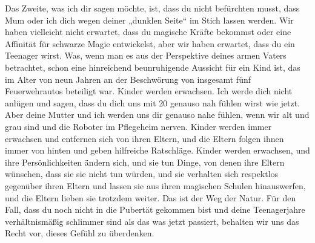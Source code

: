 \begin{writtenNote}
Das Zweite, was ich dir sagen möchte, ist, dass du nicht befürchten musst, dass Mum oder ich dich wegen deiner „dunklen Seite“ im Stich lassen werden. Wir haben vielleicht nicht erwartet, dass du magische Kräfte bekommst oder eine Affinität für schwarze Magie entwickelst, aber wir haben erwartet, dass du ein Teenager wirst. Was, wenn man es aus der Perspektive deines armen Vaters betrachtet, schon eine hinreichend beunruhigende Aussicht für ein Kind ist, das im Alter von neun Jahren an der Beschwörung von insgesamt fünf Feuerwehrautos beteiligt war.
Kinder werden erwachsen.
Ich werde dich nicht anlügen und sagen, dass du dich uns mit 20 genauso nah fühlen wirst wie jetzt. Aber deine Mutter und ich werden uns dir genauso nahe fühlen, wenn wir alt und grau sind und die Roboter im Pflegeheim nerven. Kinder werden immer erwachsen und entfernen sich von ihren Eltern, und die Eltern folgen ihnen immer von hinten und geben hilfreiche Ratschläge. Kinder werden erwachsen, und ihre Persönlichkeiten ändern sich, und sie tun Dinge, von denen ihre Eltern wünschen, dass sie sie nicht tun würden, und sie verhalten sich respektlos gegenüber ihren Eltern und lassen sie aus ihren magischen Schulen hinauswerfen, und die Eltern lieben sie trotzdem weiter. Das ist der Weg der Natur. Für den Fall, dass du noch nicht in die Pubertät gekommen bist und deine Teenagerjahre verhältnismäßig schlimmer sind als das was jetzt passiert, behalten wir uns das Recht vor, dieses Gefühl zu überdenken.


\end{writtenNote}
